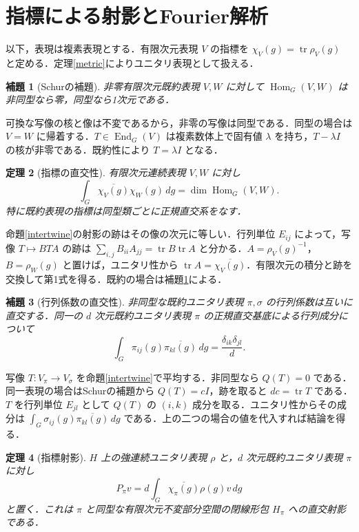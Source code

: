 \documentclass[a5paper,10pt,onecolumn]{jsarticle}
\makeatletter
\theoremstyle{mathnotetheorem}
\newtheorem{theorem}{定理}[section]
\newtheorem{lemma}[theorem]{補題}
\renewcommand{\proofname}{証明}
\renewenvironment{proof}[1][\proofname]{%
  \par\pushQED{\qed}\normalfont\topsep4\p@\@plus2\p@\relax
  \trivlist\item[\hskip\labelsep\bfseries #1]\ignorespaces
}{\popQED\endtrivlist\@endpefalse}
\makeatother
\begin{document}
\section{指標による射影とFourier解析}
以下，表現は複素表現とする．有限次元表現 $V$ の指標を $\chi_V(g)=\operatorname{tr}\rho_V(g)$ と定める．定理\ref{metric}によりユニタリ表現として扱える．
\begin{lemma}[Schurの補題]\label{schur}
非零有限次元既約表現 $V,W$ に対して $\operatorname{Hom}_G(V,W)$ は非同型なら零，同型なら1次元である．
\end{lemma}
\begin{proof}
可換な写像の核と像は不変であるから，非零の写像は同型である．同型の場合は $V=W$ に帰着する．$T\in\operatorname{End}_G(V)$ は複素数体上で固有値 $\lambda$ を持ち，$T-\lambda I$ の核が非零である．既約性により $T=\lambda I$ となる．
\end{proof}
\begin{theorem}[指標の直交性]\label{char}
有限次元連続表現 $V,W$ に対し
\[
 \int_G\overline{\chi_V(g)}\chi_W(g)\,dg
 =\dim\operatorname{Hom}_G(V,W).
\]
特に既約表現の指標は同型類ごとに正規直交系をなす．
\end{theorem}
\begin{proof}
命題\ref{intertwine}の射影の跡はその像の次元に等しい．行列単位 $E_{ij}$ によって，写像 $T\mapsto BTA$ の跡は $\sum_{i,j}B_{ii}A_{jj}=\operatorname{tr}B\operatorname{tr}A$ と分かる．$A=\rho_V(g)^{-1}$，$B=\rho_W(g)$ と置けば，ユニタリ性から $\operatorname{tr}A=\overline{\chi_V(g)}$．有限次元の積分と跡を交換して第1式を得る．既約の場合は補題\ref{schur}による．
\end{proof}
\begin{lemma}[行列係数の直交性]\label{matrix}
非同型な既約ユニタリ表現 $\pi,\sigma$ の行列係数は互いに直交する．同一の $d$ 次元既約ユニタリ表現 $\pi$ の正規直交基底による行列成分について
\[
 \int_G \pi_{ij}(g)\overline{\pi_{kl}(g)}\,dg
 =\frac{\delta_{ik}\delta_{jl}}d.
\]
\end{lemma}
\begin{proof}
写像 $T:V_\pi\to V_\sigma$ を命題\ref{intertwine}で平均する．非同型なら $Q(T)=0$ である．同一表現の場合はSchurの補題から $Q(T)=cI$，跡を取ると $dc=\operatorname{tr}T$ である．$T$ を行列単位 $E_{jl}$ として $Q(T)$ の $(i,k)$ 成分を取る．ユニタリ性からその成分は $\int_G\sigma_{ij}(g)\overline{\pi_{kl}(g)}\,dg$ である．上の二つの場合の値を代入すれば結論を得る．
\end{proof}
\begin{theorem}[指標射影]\label{isotypic}
$H$ 上の強連続ユニタリ表現 $\rho$ と，$d$ 次元既約ユニタリ表現 $\pi$ に対し
\[
 P_\pi v=d\int_G\overline{\chi_\pi(g)}\rho(g)v\,dg
\]
と置く．これは $\pi$ と同型な有限次元不変部分空間の閉線形包 $H_\pi$ への直交射影である．
\end{theorem}
\end{document}
